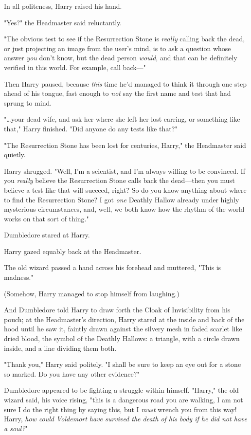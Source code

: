 In all politeness, Harry raised his hand.

"Yes?" the Headmaster said reluctantly.

"The obvious test to see if the Resurrection Stone is \emph{really} calling 
back the dead, or just projecting an image from the user's mind, is to ask a 
question whose answer \emph{you} don't know, but the dead person \emph{would}, 
and that can be definitely verified in this world. For example, call back---"

Then Harry paused, because \emph{this} time he'd managed to think it through 
one step ahead of his tongue, fast enough to \emph{not} say the first name and 
test that had sprung to mind.

"{\ldots}your dead wife, and ask her where she left her lost earring, or 
something like that," Harry finished. "Did anyone do any tests like that?"

"The Resurrection Stone has been lost for centuries, Harry," the Headmaster 
said quietly.

Harry shrugged. "Well, I'm a scientist, and I'm always willing to be convinced. 
If you \emph{really} believe the Resurrection Stone calls back the dead---then 
you must believe a test like that will succeed, right? So do you know anything 
about where to find the Resurrection Stone? I got \emph{one} Deathly Hallow 
already under highly mysterious circumstances, and, well, we both know how the 
rhythm of the world works on that sort of thing."

Dumbledore stared at Harry.

Harry gazed equably back at the Headmaster.

The old wizard passed a hand across his forehead and muttered, "This is 
madness."

(Somehow, Harry managed to stop himself from laughing.)

And Dumbledore told Harry to draw forth the Cloak of Invisibility from his 
pouch; at the Headmaster's direction, Harry stared at the inside and back of 
the hood until he saw it, faintly drawn against the silvery mesh in faded 
scarlet like dried blood, the symbol of the Deathly Hallows: a triangle, with a 
circle drawn inside, and a line dividing them both.

"Thank you," Harry said politely. "I shall be sure to keep an eye out for a 
stone so marked. Do you have any other evidence?"

Dumbledore appeared to be fighting a struggle within himself. "Harry," the old 
wizard said, his voice rising, "this is a dangerous road you are walking, I am 
not sure I do the right thing by saying this, but I \emph{must} wrench you from 
this way! Harry, \emph{how could Voldemort have survived the death of his body 
if he did not have a soul?}"

